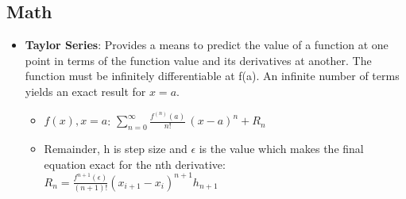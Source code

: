 \documentclass[fontsize=5pt]{scrartcl}
\begin{document}
\begin{multicols}{3}
    \subsection{Math}
      \begin{itemize}
      \item \textbf{Taylor Series}: Provides a means to predict the value of a function at one point in terms of
             the function value and its derivatives at another. The function must be infinitely differentiable
             at f(a). An infinite number of terms yields an exact result for $x=a$.
        \begin{itemize}
          \item $f(x), x=a$: $\sum_{n=0} ^ {\infty} \frac {f^{(n)}(a)}{n!} \, (x-a)^{n} + R_n$
          \item Remainder, h is step size and $\epsilon$ is the value which makes the final
          equation exact for the nth derivative: \\ $R_n = \frac{f^{n+1}(\epsilon)}{(n+1)!} (x_{i+1}-x_i)^{n+1}h_{n+1}$ \\
          

\end{itemize}
\end{itemize}
\end{multicols}
\end{document}
